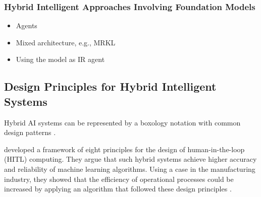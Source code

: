 \subsubsection{Hybrid Intelligent Approaches Involving Foundation Models}

\begin{itemize}
    \item Agents 
    \item Mixed architecture, e.g., MRKL
    \item Using the model as IR agent 
\end{itemize}


\subsection{Design Principles for Hybrid Intelligent Systems}

Hybrid AI systems can be represented by a boxology notation with common design patterns \citep{harmelenBoxologyDesignPatterns2019,
vanbekkumModularDesignPatterns2021,witschelVisualizationPatternsHybrid2021}.

\cite{ostheimerAllianceHumansMachines2021} developed a framework of eight principles for the design of human-in-the-loop (HITL) 
computing. They argue that such hybrid systems achieve higher accuracy and reliability of machine learning algorithms. Using a 
case in the manufacturing industry, they showed that the efficiency of operational processes could be increased by applying an 
algorithm that followed these design principles \citep{ostheimerAllianceHumansMachines2021}.

{
    \begin{center}
        \vskip 0.2in
        \vskip 0.2in
    \end{center}
}


